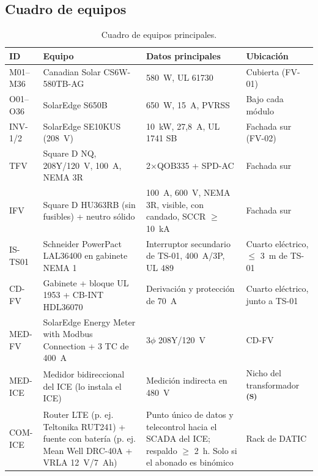 \documentclass[12pt]{article}
\newcommand{\supuesto}{\textsuperscript{\textcolor{orange!80!black}{\textbf{(S)}}}}
\begin{document}
\subsection{Cuadro de equipos}
\begin{table}[H]
\centering\small
\caption{Cuadro de equipos principales.}\label{tab:equipos}
\begin{tabularx}{\textwidth}{L{1.4cm}L{4.2cm}YL{2.4cm}}
\toprule
\textbf{ID} & \textbf{Equipo} & \textbf{Datos principales} & \textbf{Ubicación}\\
\midrule
M01--M36 & Canadian Solar CS6W-580TB-AG & 580~W, UL 61730 & Cubierta (FV-01)\\
O01--O36 & SolarEdge S650B & 650~W, 15~A, PVRSS & Bajo cada módulo\\
INV-1/2 & SolarEdge SE10KUS (208~V) & 10~kW, 27,8~A, UL 1741 SB & Fachada sur (FV-02)\\
TFV & Square D NQ, 208Y/120~V, 100~A, NEMA 3R & 2$\times$QOB335 + SPD-AC & Fachada sur\\
IFV & Square D HU363RB (sin fusibles) + neutro sólido & 100~A, 600~V, NEMA 3R, visible, con candado, SCCR $\geq$ 10~kA & Fachada sur\\
IS-TS01 & Schneider PowerPact LAL36400 en gabinete NEMA 1 & Interruptor secundario de TS-01, 400~A/3P, UL 489 & Cuarto eléctrico, $\leq$ 3~m de TS-01\\
CD-FV & Gabinete + bloque UL 1953 + CB-INT HDL36070 & Derivación y protección de 70~A & Cuarto eléctrico, junto a TS-01\\
MED-FV & SolarEdge Energy Meter with Modbus Connection + 3 TC de 400~A & 3$\phi$ 208Y/120~V & CD-FV\\
MED-ICE & Medidor bidireccional del ICE (lo instala el ICE) & Medición indirecta en 480~V & Nicho del transformador \supuesto{}\\
COM-ICE & Router LTE (p. ej. Teltonika RUT241) + fuente con batería (p. ej. Mean Well DRC-40A + VRLA 12~V/7~Ah) & Punto único de datos y telecontrol hacia el SCADA del ICE; respaldo $\geq$ 2~h. Solo si el abonado es binómico & Rack de DATIC\\
\bottomrule
\end{tabularx}
\end{table}
\end{document}
